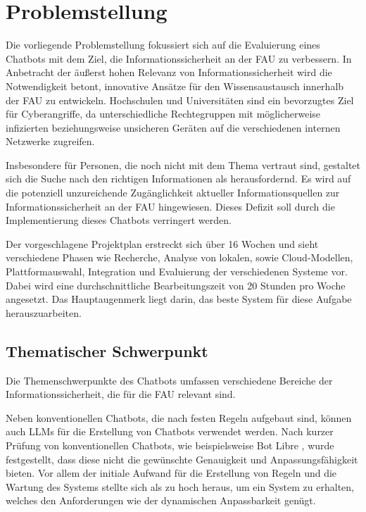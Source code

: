 \documentclass[german,report]{i1thesis}
\begin{document}
\section{Problemstellung}%
\label{sec:problemstellung}
Die vorliegende Problemstellung fokussiert sich auf die Evaluierung eines Chatbots mit dem Ziel, die Informationssicherheit an der \ac{FAU} zu verbessern.
In Anbetracht der äußerst hohen Relevanz von Informationssicherheit wird die Notwendigkeit betont, innovative Ansätze für den Wissensaustausch innerhalb der \ac{FAU} zu entwickeln.
Hochschulen und Universitäten sind ein bevorzugtes Ziel für Cyberangriffe, da unterschiedliche Rechtegruppen mit möglicherweise infizierten beziehungsweise unsicheren Geräten auf die verschiedenen internen Netzwerke zugreifen.

Insbesondere für Personen, die noch nicht mit dem Thema vertraut sind, gestaltet sich die Suche nach den richtigen Informationen als herausfordernd.
Es wird auf die potenziell unzureichende Zugänglichkeit aktueller Informationsquellen zur Informationssicherheit an der \ac{FAU} hingewiesen.
Dieses Defizit soll durch die Implementierung dieses Chatbots verringert werden.

Der vorgeschlagene Projektplan erstreckt sich über 16 Wochen und sieht verschiedene Phasen wie Recherche, Analyse von lokalen, sowie Cloud-Modellen, Plattformauswahl, Integration und Evaluierung der verschiedenen Systeme vor.
Dabei wird eine durchschnittliche Bearbeitungszeit von 20 Stunden pro Woche angesetzt.
Das Hauptaugenmerk liegt darin, das beste System für diese Aufgabe herauszuarbeiten.

\subsection{Thematischer Schwerpunkt}%
\label{subsec:thematischer-schwerpunkt}

Die Themenschwerpunkte des Chatbots umfassen verschiedene Bereiche der Informationssicherheit, die für die \ac{FAU} relevant sind.

Neben konventionellen Chatbots, die nach festen Regeln aufgebaut sind, können auch \acp{LLM} für die Erstellung von Chatbots verwendet werden.
Nach kurzer Prüfung von konventionellen Chatbots, wie beispielsweise Bot Libre \autocite{botlibre}, wurde festgestellt, dass diese nicht die gewünschte Genauigkeit und Anpassungsfähigkeit bieten.
Vor allem der initiale Aufwand für die Erstellung von Regeln und die Wartung des Systems stellte sich als zu hoch heraus, um ein System zu erhalten, welches den Anforderungen wie der dynamischen Anpassbarkeit genügt.
\end{document}
